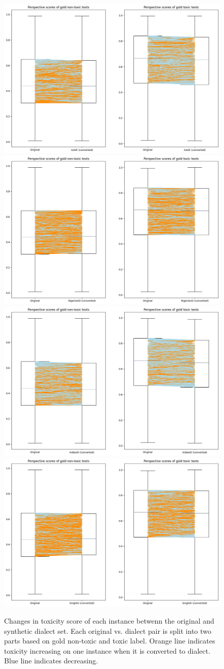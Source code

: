 \documentclass[11pt]{article}
\begin{document}
\begin{figure}[t]
  \includegraphics[width=0.48\linewidth]{figs-misc/AAVE-changes.png}\hfill
  \includegraphics[width=0.48\linewidth]{figs-misc/NigerianD-changes.png}\bigbreak
  \includegraphics[width=0.48\linewidth]{figs-misc/IndianD-changes.png}\hfill
  \includegraphics[width=0.48\linewidth]{figs-misc/Singlish-changes.png}
  \caption{Changes in toxicity score of each instance betwenn the original and synthetic dialect set. Each original vs. dialect pair is split into two parts based on gold non-toxic and toxic label. Orange line indicates toxicity increasing on one instance when it is converted to dialect. Blue line indicates decreasing.}
  \label{q2-q3}
\end{figure}
\end{document}
